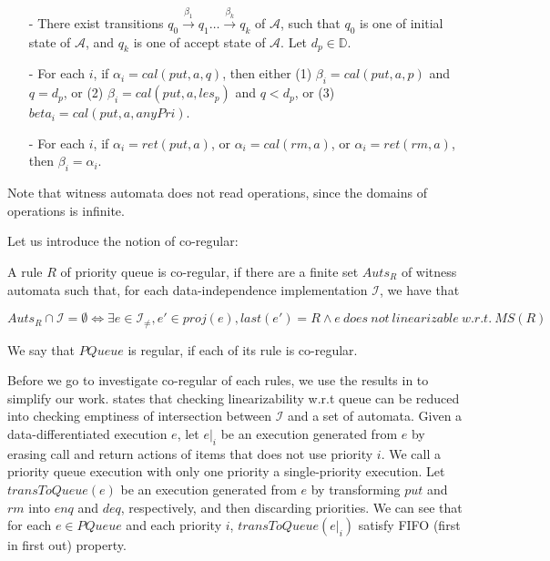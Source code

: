 \begin{itemize}
\setlength{\itemsep}{0.5pt}
\item[-] There exist transitions $q_0 \xrightarrow{\beta_1} q_1 \ldots \xrightarrow{\beta_k} q_k$ of $\mathcal{A}$, such that $q_0$ is one of initial state of $\mathcal{A}$, and $q_k$ is one of accept state of $\mathcal{A}$. Let $d_p \in \mathbb{D}$.

\item[-] For each $i$, if $\alpha_i = \textit{cal}(\textit{put},a,q)$, then either (1) $\beta_i = \textit{cal}(\textit{put},a,p)$ and $q = d_p$, or (2) $\beta_i = \textit{cal}(\textit{put},a,\textit{les}_p)$ and $q < d_p$, or (3) $beta_i = \textit{cal}(\textit{put},a,\textit{anyPri})$.

\item[-] For each $i$, if $\alpha_i = \textit{ret}(\textit{put},a)$, or $\alpha_i = \textit{cal}(\textit{rm},a)$, or $\alpha_i = \textit{ret}(\textit{rm},a)$, then $\beta_i = \alpha_i$.
\end{itemize}

Note that witness automata does not read operations, since the domains of operations is infinite.

Let us introduce the notion of co-regular:

\begin{definition}\label{def:co-regular of rules of priority queues}
A rule $R$ of priority queue is co-regular, if there are a finite set $\textit{Auts}_{R}$ of witness automata such that, for each data-independence implementation $\mathcal{I}$, we have that

$$ \textit{Auts}_{R} \cap \mathcal{I} = \emptyset \Leftrightarrow \exists e \in \mathcal{I}_{\neq},e' \in \textit{proj}(e), last(e')=R \wedge e \ does \ not \ linearizable \ w.r.t. \ \textit{MS}(R)$$

We say that $\textit{PQueue}$ is regular, if each of its rule is co-regular.
\end{definition}

Before we go to investigate co-regular of each rules, we use the results in \cite{Bouajjani:2015} to simplify our work. \cite{Bouajjani:2015} states that checking linearizability w.r.t queue can be reduced into checking emptiness of intersection between $\mathcal{I}$ and a set of automata. Given a data-differentiated execution $e$, let $e \vert_{i}$ be an execution generated from $e$ by erasing call and return actions of items that does not use priority $i$. We call a priority queue execution with only one priority a single-priority execution. Let $\textit{transToQueue}(e)$ be an execution generated from $e$ by transforming $\textit{put}$ and $\textit{rm}$ into $\textit{enq}$ and $\textit{deq}$, respectively, and then discarding priorities. We can see that for each $e \in \textit{PQueue}$ and each priority $i$, $\textit{transToQueue}(e \vert_{i})$ satisfy FIFO (first in first out) property.

